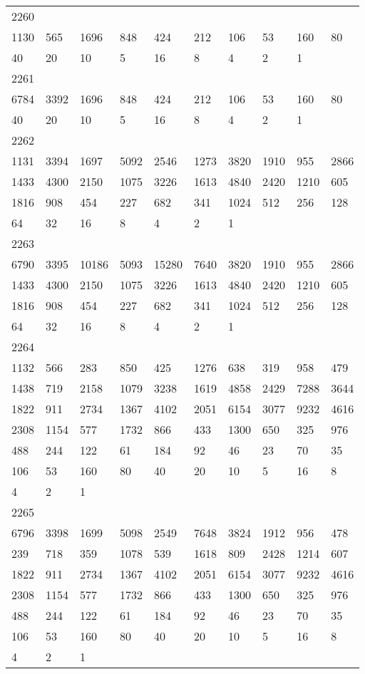 \begin{longtable}{*{10}{l}}
2260&&&&&&&&&\\
1130& 565& 1696& 848& 424& 212& 106& 53& 160& 80\\
40& 20& 10& 5& 16& 8& 4& 2& 1& \\

2261&&&&&&&&&\\
6784& 3392& 1696& 848& 424& 212& 106& 53& 160& 80\\
40& 20& 10& 5& 16& 8& 4& 2& 1& \\

2262&&&&&&&&&\\
1131& 3394& 1697& 5092& 2546& 1273& 3820& 1910& 955& 2866\\
1433& 4300& 2150& 1075& 3226& 1613& 4840& 2420& 1210& 605\\
1816& 908& 454& 227& 682& 341& 1024& 512& 256& 128\\
64& 32& 16& 8& 4& 2& 1& \\

2263&&&&&&&&&\\
6790& 3395& 10186& 5093& 15280& 7640& 3820& 1910& 955& 2866\\
1433& 4300& 2150& 1075& 3226& 1613& 4840& 2420& 1210& 605\\
1816& 908& 454& 227& 682& 341& 1024& 512& 256& 128\\
64& 32& 16& 8& 4& 2& 1& \\

2264&&&&&&&&&\\
1132& 566& 283& 850& 425& 1276& 638& 319& 958& 479\\
1438& 719& 2158& 1079& 3238& 1619& 4858& 2429& 7288& 3644\\
1822& 911& 2734& 1367& 4102& 2051& 6154& 3077& 9232& 4616\\
2308& 1154& 577& 1732& 866& 433& 1300& 650& 325& 976\\
488& 244& 122& 61& 184& 92& 46& 23& 70& 35\\
106& 53& 160& 80& 40& 20& 10& 5& 16& 8\\
4& 2& 1& \\

2265&&&&&&&&&\\
6796& 3398& 1699& 5098& 2549& 7648& 3824& 1912& 956& 478\\
239& 718& 359& 1078& 539& 1618& 809& 2428& 1214& 607\\
1822& 911& 2734& 1367& 4102& 2051& 6154& 3077& 9232& 4616\\
2308& 1154& 577& 1732& 866& 433& 1300& 650& 325& 976\\
488& 244& 122& 61& 184& 92& 46& 23& 70& 35\\
106& 53& 160& 80& 40& 20& 10& 5& 16& 8\\
4& 2& 1& \\


\end{longtable}
